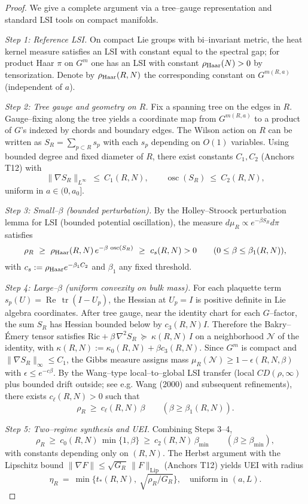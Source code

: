 \documentclass[11pt]{amsart}
\theoremstyle{plain}
\theoremstyle{definition}
\theoremstyle{remark}
\begin{document}
\begin{proof}
We give a complete argument via a tree–gauge representation and standard LSI tools on compact manifolds.

\emph{Step 1: Reference LSI.} On compact Lie groups with bi–invariant metric, the heat kernel measure satisfies an LSI with constant equal to the spectral gap; for product Haar $\pi$ on $G^{m}$ one has an LSI with constant $\rho_{\rm Haar}(N)>0$ by tensorization. Denote by $\rho_{\rm Haar}(R,N)$ the corresponding constant on $G^{m(R,a)}$ (independent of $a$).

\emph{Step 2: Tree gauge and geometry on $R$.} Fix a spanning tree on the edges in $R$. Gauge–fixing along the tree yields a coordinate map from $G^{m(R,a)}$ to a product of $G$'s indexed by chords and boundary edges. The Wilson action on $R$ can be written as $S_R=\sum_{p\subset R} s_p$ with each $s_p$ depending on $O(1)$ variables. Using bounded degree and fixed diameter of $R$, there exist constants $C_1,C_2$ (Anchors T12) with
\[
  \|\nabla S_R\|_{L^\infty}\ \le\ C_1(R,N),\qquad \operatorname{osc}(S_R)\ \le\ C_2(R,N),
\]
uniform in $a\in(0,a_0]$.

\emph{Step 3: Small–$\beta$ (bounded perturbation).} By the Holley–Stroock perturbation lemma for LSI (bounded potential oscillation), the measure $d\mu_R\propto e^{-\beta S_R}d\pi$ satisfies
\[
  \rho_R\ \ge\ \rho_{\rm Haar}(R,N)\,e^{-\beta\,\operatorname{osc}(S_R)}\ \ge\ c_s(R,N)>0\qquad (0\le \beta\le \beta_1(R,N)),
\]
with $c_s:=\rho_{\rm Haar} e^{-\beta_1 C_2}$ and $\beta_1$ any fixed threshold.

\emph{Step 4: Large–$\beta$ (uniform convexity on bulk mass).} For each plaquette term $s_p(U)=\operatorname{Re}\,\operatorname{tr}(I-U_p)$, the Hessian at $U_p=I$ is positive definite in Lie algebra coordinates. After tree gauge, near the identity chart for each $G$–factor, the sum $S_R$ has Hessian bounded below by $c_3(R,N) I$. Therefore the Bakry–Émery tensor satisfies $\mathrm{Ric}+\beta\,\nabla^2 S_R\ \succeq\ \kappa(R,N)\,I$ on a neighborhood $\mathcal N$ of the identity, with $\kappa(R,N):=\kappa_0(R,N)+\beta c_3(R,N)$. Since $G^{m}$ is compact and $\|\nabla S_R\|_{\infty}\le C_1$, the Gibbs measure assigns mass $\mu_R(\mathcal N)\ge 1-\epsilon(R,N,\beta)$ with $\epsilon\le e^{-c\beta}$. By the Wang–type local–to–global LSI transfer (local $CD(\rho,\infty)$ plus bounded drift outside; see e.g. Wang (2000) and subsequent refinements), there exists $c_\ell(R,N)>0$ such that
\[
  \rho_R\ \ge\ c_\ell(R,N)\,\beta\qquad (\beta\ge \beta_1(R,N)).
\]

\emph{Step 5: Two–regime synthesis and UEI.} Combining Steps 3–4,
\[
  \rho_R\ \ge\ c_0(R,N)\,\min\{1,\beta\}\ \ge\ c_2(R,N)\,\beta_{\min}\qquad (\beta\ge \beta_{\min}),
\]
with constants depending only on $(R,N)$. The Herbst argument with the Lipschitz bound $\|\nabla F\|\le \sqrt{G_R}\,\|F\|_{\mathrm{Lip}}$ (Anchors T12) yields UEI with radius
\[
  \eta_R\ =\ \min\Big\{t_*(R,N),\ \sqrt{\rho_R/G_R}\Big\},\quad \text{uniform in }(a,L).
\]
\end{proof}
\end{document}
